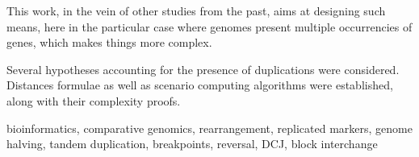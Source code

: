 \documentclass[11pt,final,twoside,nofrench]{thlifl}
\begin{document}
This work, in the vein of other studies from the past, aims at designing such means, here in the particular case where genomes present multiple occurrencies of genes, which makes things more complex.

Several hypotheses accounting for the presence of duplications were considered. Distances formulae as well as scenario computing algorithms were established, along with their complexity proofs.

 

\medskip
{} bioinformatics, comparative genomics, rearrangement, replicated markers, genome halving, tandem duplication, breakpoints, reversal, DCJ, block interchange
\end{document}
